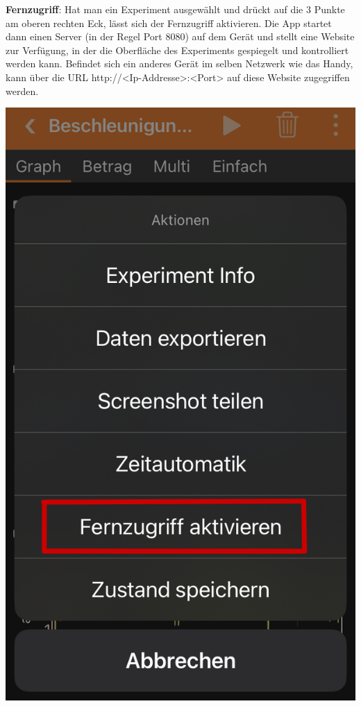 \documentclass[../main.tex]{subfiles}
\begin{document}
\begin{tcolorbox}
    \begin{minipage}[]{0.5\textwidth} 
        \textbf{Fernzugriff}: Hat man ein Experiment ausgewählt und drückt auf die 3 Punkte am oberen rechten Eck, lässt sich der \glqq Fernzugriff\grqq{} aktivieren. Die App startet dann einen Server (in der Regel Port 8080) auf dem Gerät und stellt eine Website zur Verfügung, in der die Oberfläche des Experiments gespiegelt und kontrolliert werden kann. Befindet sich ein anderes Gerät im selben Netzwerk wie das Handy, kann über die URL \glqq http://<Ip-Addresse>:<Port>\grqq{} auf diese Website zugegriffen werden.
    \end{minipage}
    \hspace{0.5cm}
    \begin{minipage}[]{0.2\textwidth}
        \includegraphics[width=\textwidth]{img/fernzugriff2}

\end{minipage}
\end{tcolorbox}
\end{document}
